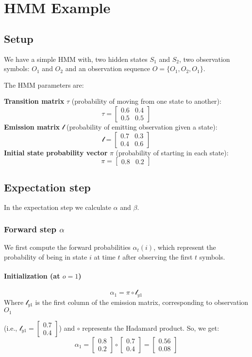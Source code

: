 \section{HMM Example}
\subsection{Setup}
We have a simple HMM with, two hidden states \( S_1 \) and \( S_2 \), two observation symbols: \( O_1 \) and \( O_2 \) and an observation sequence \( O = \{ O_1, O_2, O_1 \} \).

The HMM parameters are:

\textbf{Transition matrix} \( \tau \) (probability of moving from one state to another):
  \[
  \tau = \begin{bmatrix}
  0.6 & 0.4 \\
  0.5 & 0.5
  \end{bmatrix}
  \]
\textbf{Emission matrix} \( \mathcal{l} \) (probability of emitting observation given a state):
  \[
  \mathcal{l} = \begin{bmatrix}
  0.7 & 0.3 \\
  0.4 & 0.6
  \end{bmatrix}
  \]
\textbf{Initial state probability vector} \( \pi \) (probability of starting in each state):
  \[
  \pi = \begin{bmatrix} 0.8 & 0.2 \end{bmatrix}
  \]
\subsection{Expectation step}
In the expectation step we calculate $\alpha$ and $\beta$.
\subsubsection{Forward step $\alpha$}

We first compute the forward probabilities \( \alpha_t(i) \), which represent the probability of being in state \( i \) at time \( t \) after observing the first \( t \) symbols.

\paragraph{Initialization (at \( o = 1 \))}
  \[
  \alpha_1 = \pi \circ \mathcal{l}_{y1}
  \]
  Where \( \mathcal{l}_{y1} \) is the first column of the emission matrix, corresponding to observation \( O_1 \) 
  
  (i.e., \( \mathcal{l}_{y1} = \begin{bmatrix} 0.7 \\ 0.4 \end{bmatrix} \)) and \( \circ \) represents the Hadamard product. So, we get:
  \[
  \alpha_1 = \begin{bmatrix} 0.8 \\ 0.2 \end{bmatrix} \circ \begin{bmatrix} 0.7 \\ 0.4 \end{bmatrix} = \begin{bmatrix} 0.56 \\ 0.08 \end{bmatrix}
  \]

